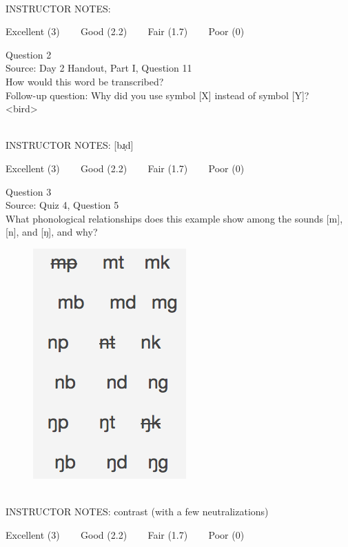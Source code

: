 \documentclass[12pt]{article}
\begin{document}
~\\
INSTRUCTOR NOTES: 


\vfill
Excellent (3) ~~~ Good (2.2) ~~~ Fair (1.7) ~~~ Poor (0)
\newpage

{\large Question 2}\\

Source: Day 2 Handout, Part I, Question 11\\

How would this word be transcribed?\\ Follow-up question: Why did you use symbol [X] instead of symbol [Y]?\\

<bird>


~\\
INSTRUCTOR NOTES: [bɹ̩d]


\vfill
Excellent (3) ~~~ Good (2.2) ~~~ Fair (1.7) ~~~ Poor (0)
\newpage

{\large Question 3}\\

Source: Quiz 4, Question 5\\

What phonological relationships does this example show among the sounds [m], [n], and [ŋ], and why?\\

\begin{figure}[H]
\includegraphics{../images/quiz4question5_d.png}
\end{figure}

~\\
INSTRUCTOR NOTES: contrast (with a few neutralizations)


\vfill
Excellent (3) ~~~ Good (2.2) ~~~ Fair (1.7) ~~~ Poor (0)
\newpage
\end{document}
